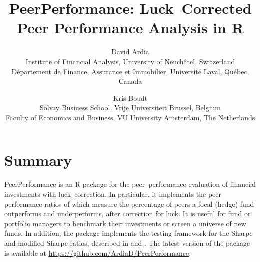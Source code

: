 \documentclass[11pt]{article}
\begin{document}
\title{PeerPerformance: Luck--Corrected Peer Performance Analysis in R}
\author{David Ardia\\
Institute of Financial Analysis, University of Neuch\^atel, Switzerland\\
D\'epartement de Finance, Assurance et Immobilier, Universit\'e Laval, Qu\'ebec, Canada
\and
Kris Boudt\\
Solvay Business School, Vrije Universiteit Brussel, Belgium\\
Faculty of Economics and Business, VU University Amsterdam, The Netherlands
}
	
\maketitle

\section*{Summary}

PeerPerformance is an R package \citep{R} for the peer--performance evaluation of financial investments with luck--correction. In particular, it implements the peer performance ratios of \citet{ArdiaBoudt2016} which measure the percentage of peers 
a focal (hedge) fund outperforms and underperforms, after correction
for luck. It is useful for fund or portfolio managers to benchmark their investments or screen a universe of new funds. In addition, the package implements the testing framework for the Sharpe and modified Sharpe ratios, described in \citet{LedoitWolf2008} and \citet{ArdiaBoudt2015}. The latest version of the package
is available at \url{https://github.com/ArdiaD/PeerPerformance}.



	
\end{document}

